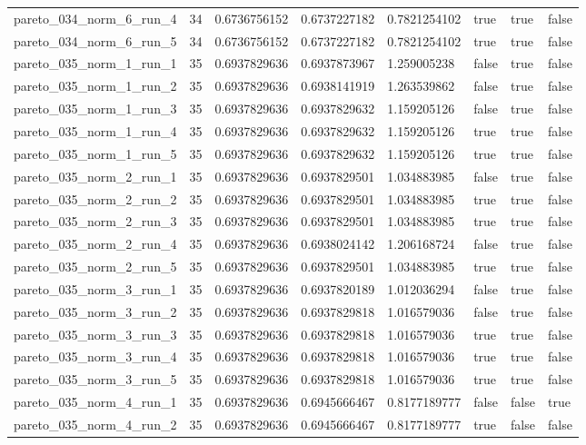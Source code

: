 \begin{tabular}{@{}llllllll@{}}
pareto\_034\_norm\_6\_run\_4 & 34 & 0.6736756152 & 0.6737227182 & 0.7821254102 & true & true & false \\
pareto\_034\_norm\_6\_run\_5 & 34 & 0.6736756152 & 0.6737227182 & 0.7821254102 & true & true & false \\
pareto\_035\_norm\_1\_run\_1 & 35 & 0.6937829636 & 0.6937873967 & 1.259005238 & false & true & false \\
pareto\_035\_norm\_1\_run\_2 & 35 & 0.6937829636 & 0.6938141919 & 1.263539862 & false & true & false \\
pareto\_035\_norm\_1\_run\_3 & 35 & 0.6937829636 & 0.6937829632 & 1.159205126 & false & true & false \\
pareto\_035\_norm\_1\_run\_4 & 35 & 0.6937829636 & 0.6937829632 & 1.159205126 & true & true & false \\
pareto\_035\_norm\_1\_run\_5 & 35 & 0.6937829636 & 0.6937829632 & 1.159205126 & true & true & false \\
pareto\_035\_norm\_2\_run\_1 & 35 & 0.6937829636 & 0.6937829501 & 1.034883985 & false & true & false \\
pareto\_035\_norm\_2\_run\_2 & 35 & 0.6937829636 & 0.6937829501 & 1.034883985 & true & true & false \\
pareto\_035\_norm\_2\_run\_3 & 35 & 0.6937829636 & 0.6937829501 & 1.034883985 & true & true & false \\
pareto\_035\_norm\_2\_run\_4 & 35 & 0.6937829636 & 0.6938024142 & 1.206168724 & false & true & false \\
pareto\_035\_norm\_2\_run\_5 & 35 & 0.6937829636 & 0.6937829501 & 1.034883985 & true & true & false \\
pareto\_035\_norm\_3\_run\_1 & 35 & 0.6937829636 & 0.6937820189 & 1.012036294 & false & true & false \\
pareto\_035\_norm\_3\_run\_2 & 35 & 0.6937829636 & 0.6937829818 & 1.016579036 & false & true & false \\
pareto\_035\_norm\_3\_run\_3 & 35 & 0.6937829636 & 0.6937829818 & 1.016579036 & true & true & false \\
pareto\_035\_norm\_3\_run\_4 & 35 & 0.6937829636 & 0.6937829818 & 1.016579036 & true & true & false \\
pareto\_035\_norm\_3\_run\_5 & 35 & 0.6937829636 & 0.6937829818 & 1.016579036 & true & true & false \\
pareto\_035\_norm\_4\_run\_1 & 35 & 0.6937829636 & 0.6945666467 & 0.8177189777 & false & false & true \\
pareto\_035\_norm\_4\_run\_2 & 35 & 0.6937829636 & 0.6945666467 & 0.8177189777 & true & false & false \\

\end{tabular}
